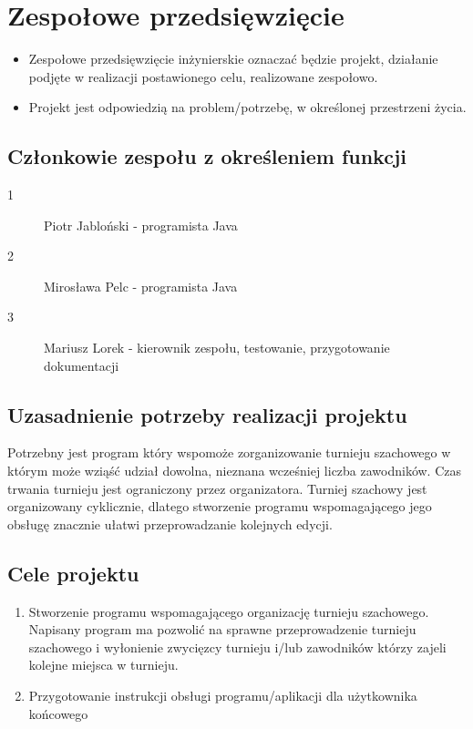 \chapter{Zespołowe przedsięwzięcie}

\begin{itemize}
\item Zespołowe przedsięwzięcie inżynierskie oznaczać będzie projekt, działanie podjęte w realizacji postawionego celu, realizowane zespołowo.
\item Projekt jest odpowiedzią na problem/potrzebę, w określonej przestrzeni życia.
\end{itemize}

\section{Członkowie zespołu z określeniem funkcji}
\begin{description}
\item[1] Piotr Jabloński - programista Java
\item[2] Mirosława Pelc - programista Java
\item[3] Mariusz Lorek - kierownik zespołu, testowanie, przygotowanie dokumentacji
\end{description}

\section{Uzasadnienie potrzeby realizacji projektu}
Potrzebny jest program który wspomoże zorganizowanie turnieju szachowego w którym może wziąść udział dowolna, nieznana wcześniej liczba zawodników. Czas trwania turnieju jest ograniczony przez organizatora. Turniej szachowy jest organizowany cyklicznie, dlatego stworzenie programu wspomagającego jego obsługę znacznie ułatwi przeprowadzanie kolejnych edycji.


\section{Cele projektu}
\begin{enumerate}
\item Stworzenie programu wspomagającego organizację turnieju szachowego.
Napisany program ma pozwolić na sprawne przeprowadzenie turnieju szachowego i wyłonienie zwycięzcy turnieju i/lub zawodników którzy zajeli kolejne miejsca w turnieju.
\item Przygotowanie instrukcji obsługi programu/aplikacji dla użytkownika końcowego
\end{enumerate}
 


